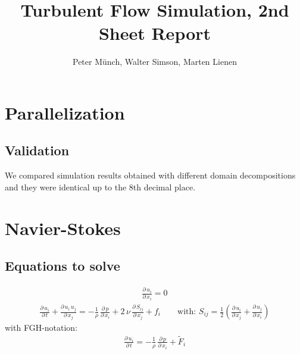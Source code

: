 \documentclass[11pt,a4paper]{article}
\title{Turbulent Flow Simulation, 2nd Sheet Report}
\author{Peter Münch, Walter Simson, Marten Lienen}
\begin{document}
\newcommand{\abl}[2]{\frac{\partial \, #1}{\partial \, #2}}
\newcommand{\abll}[2]{\frac{\partial^2 \, #1}{\partial \, #2^2}}
\newcommand{\ave}[1]{\left\langle#1\right\rangle}
\newcommand{\new}[1]{\textcolor{red}{#1}}

\maketitle

\section{Parallelization}

\subsection{Validation}

We compared simulation results obtained with different domain decompositions and
they were identical up to the 8th decimal place.

\section{Navier-Stokes}
\subsection{Equations to solve}
\begin{align}
\abl{u_i}{x_i}=0
\end{align}
\begin{align}
\abl{u_i	}{t}+\abl{u_i\,u_j}{x_j}=-\frac{1}{\rho}\,\abl{p}{x_i}+2\,\nu\,\abl{S_{ij}}{x_j}+f_i \qquad
\text{with: }S_{ij}=\frac{1}{2}\left(\abl{u_i}{x_j}+\abl{u_j}{x_i}\right)
\end{align}
with FGH-notation:
\begin{align}
\abl{u_i	}{t}=-\frac{1}{\rho}\,\abl{p}{x_i}+\tilde F_i
\end{align}
\end{document}
